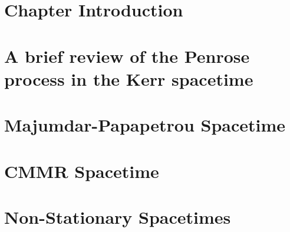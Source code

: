 \section{Chapter Introduction}
\label{ch:penrose_binaries:sec:intro}


\section{A brief review of the Penrose process in the Kerr spacetime}
\label{ch:penrose_binaries:sec:penrose_review}


\section{Majumdar-Papapetrou Spacetime}
\label{ch:penrose_binaries:sec:mp_penrose}


\section{CMMR Spacetime}
\label{ch:penrose_binaries:sec:cmmr_penrose}


\section{Non-Stationary Spacetimes}
\label{ch:penrose_binaries:sec:arbitrary_penrose}

